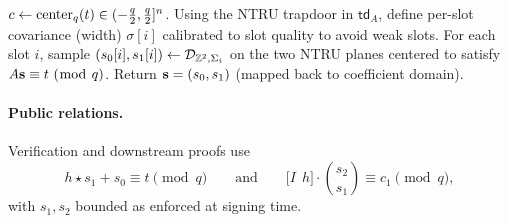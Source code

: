 \begin{algorithm}[H]
\caption{$\SampPre(\mathsf{td}_A,t;s)$ — two-plane hybrid sampler (sketch)}\label{alg:samppre}
\begin{algorithmic}[1]
\State $c \leftarrow \mathrm{center}_q(t)\in(-\frac{q}{2},\frac{q}{2}]^n$.
\State Using the NTRU trapdoor in $\mathsf{td}_A$, define per-slot covariance (width) $\sigma[i]$ calibrated to slot quality to avoid weak slots.
\State For each slot $i$, sample $(s_0[i],s_1[i]) \leftarrow \mathcal{D}_{\mathbb{Z}^2,\Sigma_i}$ on the two NTRU planes centered to satisfy $A\mathbf{s}\equiv t \ (\bmod\ q)$.
\State Return $\mathbf{s}=(s_0,s_1)$ (mapped back to coefficient domain).
\end{algorithmic}
\end{algorithm}


\paragraph{Public relations.}
Verification and downstream proofs use
\[
  h\star s_1 + s_0 \equiv t \pmod q
  \qquad\text{and}\qquad
  \big[I\ \ h\big]\!\cdot\!\binom{s_2}{s_1} \equiv c_1 \pmod q,
\]
with $s_1,s_2$ bounded as enforced at signing time.
